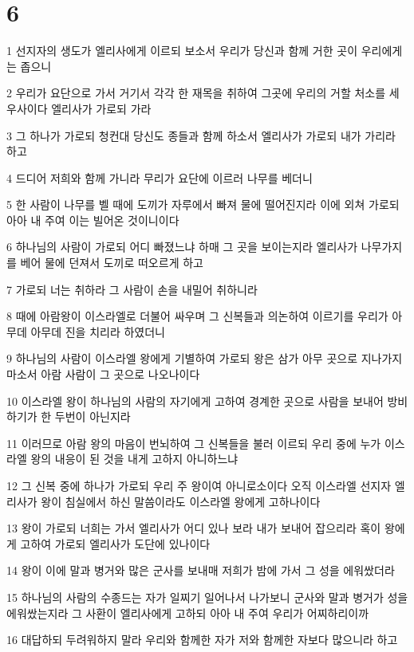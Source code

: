 \chapter{6}

\par 1 선지자의 생도가 엘리사에게 이르되 보소서 우리가 당신과 함께 거한 곳이 우리에게는 좁으니
\par 2 우리가 요단으로 가서 거기서 각각 한 재목을 취하여 그곳에 우리의 거할 처소를 세우사이다 엘리사가 가로되 가라
\par 3 그 하나가 가로되 청컨대 당신도 종들과 함께 하소서 엘리사가 가로되 내가 가리라 하고
\par 4 드디어 저희와 함께 가니라 무리가 요단에 이르러 나무를 베더니
\par 5 한 사람이 나무를 벨 때에 도끼가 자루에서 빠져 물에 떨어진지라 이에 외쳐 가로되 아아 내 주여 이는 빌어온 것이니이다
\par 6 하나님의 사람이 가로되 어디 빠졌느냐 하매 그 곳을 보이는지라 엘리사가 나무가지를 베어 물에 던져서 도끼로 떠오르게 하고
\par 7 가로되 너는 취하라 그 사람이 손을 내밀어 취하니라
\par 8 때에 아람왕이 이스라엘로 더불어 싸우며 그 신복들과 의논하여 이르기를 우리가 아무데 아무데 진을 치리라 하였더니
\par 9 하나님의 사람이 이스라엘 왕에게 기별하여 가로되 왕은 삼가 아무 곳으로 지나가지 마소서 아람 사람이 그 곳으로 나오나이다
\par 10 이스라엘 왕이 하나님의 사람의 자기에게 고하여 경계한 곳으로 사람을 보내어 방비하기가 한 두번이 아닌지라
\par 11 이러므로 아람 왕의 마음이 번뇌하여 그 신복들을 불러 이르되 우리 중에 누가 이스라엘 왕의 내응이 된 것을 내게 고하지 아니하느냐
\par 12 그 신복 중에 하나가 가로되 우리 주 왕이여 아니로소이다 오직 이스라엘 선지자 엘리사가 왕이 침실에서 하신 말씀이라도 이스라엘 왕에게 고하나이다
\par 13 왕이 가로되 너희는 가서 엘리사가 어디 있나 보라 내가 보내어 잡으리라 혹이 왕에게 고하여 가로되 엘리사가 도단에 있나이다
\par 14 왕이 이에 말과 병거와 많은 군사를 보내매 저희가 밤에 가서 그 성을 에워쌌더라
\par 15 하나님의 사람의 수종드는 자가 일찌기 일어나서 나가보니 군사와 말과 병거가 성을 에워쌌는지라 그 사환이 엘리사에게 고하되 아아 내 주여 우리가 어찌하리이까
\par 16 대답하되 두려워하지 말라 우리와 함께한 자가 저와 함께한 자보다 많으니라 하고
